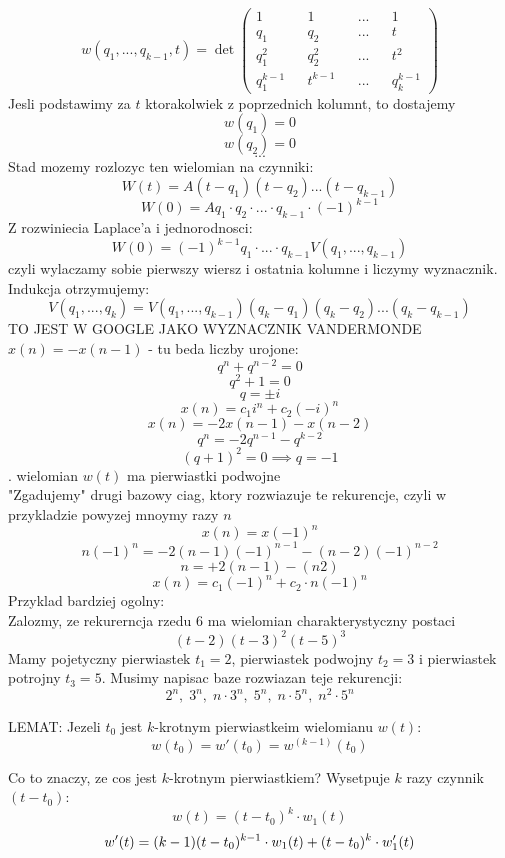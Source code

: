 \documentclass{article}
\begin{document}
    \dowod
        $$w(q_1, ..., q_{k-1}, t)=\det\begin{pmatrix}1&&1&&...&&1\\q_1&&q_2&&...&&t\\q_1^2&&q_2^2&&...&&t^2\\q_1^{k-1}&&t^{k-1}&&...&&q_k^{k-1}\end{pmatrix}$$
        Jesli podstawimy za $t$ ktorakolwiek z poprzednich kolumnt, to dostajemy
        $$w(q_1)=0$$
        $$w(q_2)=0$$
        $$...$$
        Stad mozemy rozlozyc ten wielomian na czynniki:
        $$W(t)=A(t-q_1)(t-q_2)...(t-q_{k-1})$$
        $$W(0)=  Aq_1\cdot q_2\cdot ...\cdot q_{k-1}\cdot(-1)^{k-1}$$
        Z rozwiniecia Laplace'a i jednorodnosci:
        $$W(0)=(-1)^{k-1}q_1\cdot...\cdot q_{k-1}V(q_1, ..., q_{k-1})$$
        czyli wylaczamy sobie pierwszy wiersz i ostatnia kolumne i liczymy wyznacznik.\smallskip\\
        Indukcja otrzymujemy:
        $$V(q_1, ..., q_k)=V(q_1, ..., q_{k-1})(q_k-q_1)(q_k-q_2)...(q_k-q_{k-1})$$
        \kondow
        TO JEST W GOOGLE JAKO WYZNACZNIK \color{emp}VANDERMONDE\color{txt}\bigskip\\
        \przyk
        $x(n)=-x(n-1)$ - tu beda liczby urojone:
        $$q^n+q^{n-2}=0$$
        $$q^2+1=0$$
        $$q=\pm i$$
        $$x(n)=c_1i^n+c_2(-i)^n$$
        $$x(n)=-2x(n-1)-x(n-2)$$
        $$q^n=-2q^{n-1}-q^{k-2}$$
        $$(q+1)^2=0\implies q=-1$$
    . wielomian $w(t)$ ma pierwiastki podwojne\medskip\\
    "Zgadujemy" drugi bazowy ciag, ktory rozwiazuje te rekurencje, czyli w przykladzie powyzej mnoymy razy $n$
    $$x(n)=x(-1)^n$$
    $$n(-1)^n=-2(n-1)(-1)^{n-1}-(n-2)(-1)^{n-2}$$
    $$n=+2(n-1)-(n2)$$
    $$x(n)=c_1(-1)^n+c_2\cdot n(-1)^n$$
    Przyklad bardziej ogolny:\medskip\\
    Zalozmy, ze rekurerncja rzedu 6 ma wielomian charakterystyczny postaci
    $$(t-2)(t-3)^2(t-5)^3$$
    Mamy pojetyczny pierwiastek $t_1=2$, pierwiastek podwojny $t_2=3$ i pierwiastek potrojny $t_3=5$. Musimy napisac baze rozwiazan teje rekurencji:
    $$2^n,\;3^n,\;n\cdot 3^n,\;5^n,\;n\cdot5^n,\;n^2\cdot5^n$$
    \begin{center}
        LEMAT: Jezeli $t_0$ jest $k$-krotnym pierwiastkeim wielomianu $w(t)$:
        $$w(t_0)=w'(t_0)=w^{(k-1)}(t_0)$$
    \end{center}
    \dowod
    Co to znaczy, ze cos jest $k$-krotnym pierwiastkiem? Wysetpuje $k$ razy czynnik $(t-t_0)$:
    $$w(t)=(t-t_0)^k\cdot w_1(t)$$
    $$w'(t)=(k-1)(t-t_0)^{k-1}\cdot w_1(t)+(t-t_0)^k\cdot w_1'(t)\bigskip$$
\end{document}
